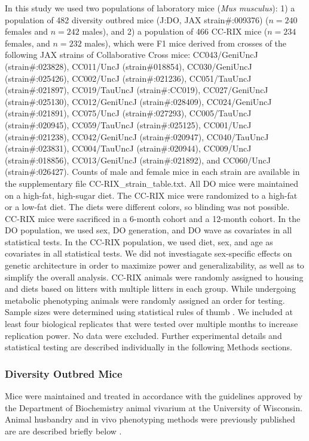 \documentclass[
]{article}
\begin{document}
In this study we used two populations of laboratory mice
(\textit{Mus musculus}): 1) a population of 482 diversity outbred mice
(J:DO, JAX strain\#:009376) (\(n = 240\) females and \(n = 242\) males),
and 2) a population of 466 CC-RIX mice (\(n = 234\) females, and
\(n = 232\) males), which were F1 mice derived from crosses of the
following JAX strains of Collaborative Cross mice: CC043/GeniUncJ
(strain\#:023828), CC011/UncJ (strain\#018854), CC030/GeniUncJ
(strain\#:025426), CC002/UncJ (strain\#:021236), CC051/TauUncJ
(strain\#:021897), CC019/TauUncJ (strain\#:CC019), CC027/GeniUncJ
(strain\#:025130), CC012/GeniUncJ (strain\#:028409), CC024/GeniUncJ
(strain\#:021891), CC075/UncJ (strain\#:027293), CC005/TauUncJ
(strain\#:020945), CC059/TauUncJ (strain\#:025125), CC001/UncJ
(strain\#:021238), CC042/GeniUncJ (strain\#:020947), CC040/TauUncJ
(strain\#:023831), CC004/TauUncJ (strain\#:020944), CC009/UncJ
(strain\#:018856), CC013/GeniUncJ (strain\#:021892), and CC060/UncJ
(strain\#:026427). Counts of male and female mice in each strain are
available in the supplementary file CC-RIX\_strain\_table.txt. All DO
mice were maintained on a high-fat, high-sugar diet. The CC-RIX mice
were randomized to a high-fat or a low-fat diet. The diets were
different colors, so blinding was not possible. CC-RIX mice were
sacrificed in a 6-month cohort and a 12-month cohort. In the DO
population, we used sex, DO generation, and DO wave as covariates in all
statistical tests. In the CC-RIX population, we used diet, sex, and age
as covariates in all statistical tests. We did not investiagate
sex-specific effects on genetic architecture in order to maximize power
and generalizability, as well as to simplify the overall analysis.
CC-RIX animals were randomly assigned to housing and diets based on
litters with multiple litters in each group. While undergoing metabolic
phenotyping animals were randomly assigned an order for testing. Sample
sizes were determined using statistical rules of thumb
\cite{van2011statistical}. We included at least four biological
replicates that were tested over multiple months to increase replication
power. No data were excluded. Further experimental details and
statistical testing are described individually in the following Methods
sections.

\subsubsection{Diversity Outbred Mice}\label{diversity-outbred-mice}

Mice were maintained and treated in accordance with the guidelines
approved by the Department of Biochemistry animal vivarium at the
University of Wisconsin. Animal husbandry and in vivo phenotyping
methods were previously published are are described briefly below
\cite{pmid31343992, pmid29567659}.
\end{document}
